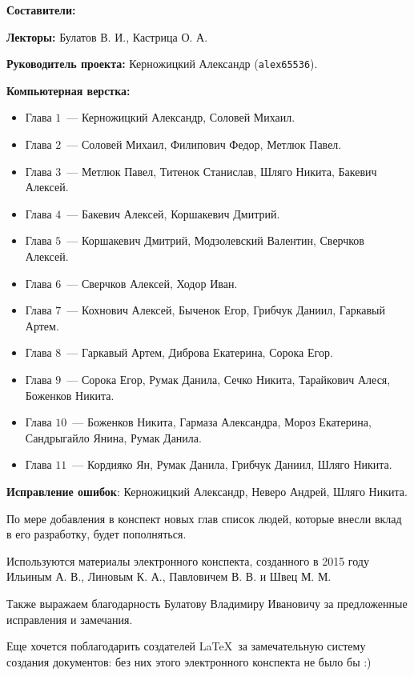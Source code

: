 \documentclass[../main.tex]{subfiles}
\begin{document}
{\Huge \bf Составители:}

\vspace{2em}

{
    \textbf{Лекторы:} Булатов В. И., Кастрица О. А.
    
    \smallskip
    
    \textbf{Руководитель проекта:} Керножицкий Александр 
    (\texttt{alex65536}).
    
    \smallskip
    
    \textbf{Компьютерная верстка:}
    \begin{itemize}
     \item Глава $1$~--- Керножицкий Александр, Соловей Михаил.
     \item Глава $2$~--- Соловей Михаил, Филипович Федор, Метлюк 
     Павел.
     \item Глава $3$~--- Метлюк Павел, Титенок Станислав, Шляго 
     Никита, Бакевич Алексей.
     \item Глава $4$~--- Бакевич Алексей, Коршакевич Дмитрий.
     \item Глава $5$~--- Коршакевич Дмитрий, Модзолевский 
     Валентин, Сверчков Алексей.
     \item Глава $6$~--- Сверчков Алексей, Ходор Иван.
     \item Глава $7$~--- Кохнович Алексей, Быченок Егор, Грибчук Даниил,
     Гаркавый Артем.
     \item Глава $8$~--- Гаркавый Артем, Диброва Екатерина, Сорока Егор.
     \item Глава $9$~--- Сорока Егор, Румак Данила, Сечко Никита, Тарайкович 
     Алеся, Боженков Никита.
     \item Глава $10$~--- Боженков Никита, Гармаза Александра, Мороз
     Екатерина, Сандрыгайло Янина, Румак Данила.
     \item Глава $11$~--- Кордияко Ян, Румак Данила, Грибчук Даниил, Шляго
     Никита.
    \end{itemize}
    
    \textbf{Исправление ошибок}: Керножицкий Александр, Неверо 
    Андрей, Шляго Никита.
    
    \medskip
    
    По мере добавления в конспект новых глав список людей, которые 
    внесли вклад в его разработку, будет пополняться.
    
    \vspace{1.5em}
    
    Используются материалы электронного конспекта, созданного в 
    2015 году Ильиным А. В., Линовым К. А., Павловичем В. В. и 
    Швец М. М.

    \smallskip
    
    Также выражаем благодарность Булатову Владимиру Ивановичу за 
    предложенные исправления и замечания.
    
    \smallskip
    
    Еще хочется поблагодарить создателей \LaTeX\ за замечательную 
    систему создания документов: без них этого электронного 
    конспекта не было бы :)
}

\pagebreak
\end{document}

